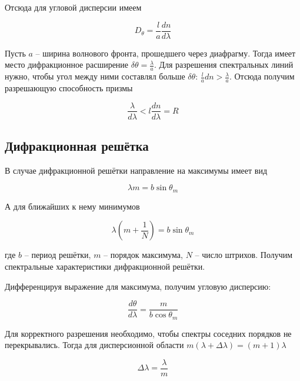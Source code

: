 \noindent
Отсюда для угловой дисперсии имеем

\begin{equation}
    D_\theta = \frac{l}{a} \frac{d n }{d \lambda}
\end{equation}

\noindent
Пусть $a$ -- ширина волнового фронта, прошедшего через диафрагму. Тогда имеет место дифракционное расширение $\delta \theta = \frac{\lambda}{a}$. Для разрешения спектральных линий нужно, чтобы угол между ними составлял больше $\delta \theta$: $\frac{l}{a} dn > \frac{\lambda}{a}$. Отсюда получим разрешающую способность призмы

\begin{equation}
    \frac{\lambda}{d \lambda} < l \frac{d n}{d \lambda} = R
\end{equation}

\subsection{Дифракционная решётка}

В случае дифракционной решётки направление на максимумы имеет вид

\begin{equation}
    \lambda m = b \sin \theta_m
\end{equation}

\noindent
А для ближайших к нему минимумов

\begin{equation}
    \lambda \left( m + \frac{1}{N} \right) = b \sin \theta_m
\end{equation}

\noindent
где $b$ -- период решётки, $m$ -- порядок максимума, $N$ -- число штрихов. Получим спектральные характеристики дифракционной решётки.

Дифференцируя выражение для максимума, получим угловую дисперсию:

\begin{equation}
    \frac{d \theta}{d \lambda} = \frac{m}{b \cos \theta_m}
\end{equation}

Для корректного разрешения необходимо, чтобы спектры соседних порядков не перекрывались. Тогда для дисперсионной области $m (\lambda + \Delta \lambda) = (m + 1) \lambda$

\begin{equation}
    \Delta \lambda = \frac{\lambda}{m}
\end{equation}

